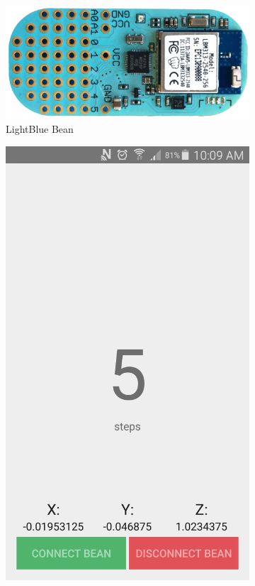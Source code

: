 \documentclass[11pt, oneside]{report}
\begin{document}
\begin{figure}[h]
    \centering
    \begin{subfigure}[b]{0.4\textwidth}
        \includegraphics[width=\textwidth]{bean}
        \caption{LightBlue Bean}
        \label{fig:bean}
    \end{subfigure}
    \hspace{3cm}
    \begin{subfigure}[b]{0.3\textwidth}
        \includegraphics[width=\textwidth]{app_screenshot}

\end{subfigure}
\end{figure}
\end{document}
